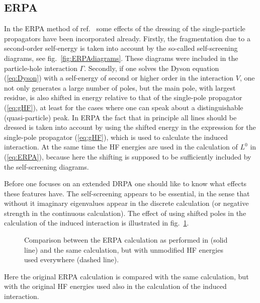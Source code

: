 \subsection{ERPA\label{sect:resultsEPRA}}
%
In the ERPA method of ref.~\cite{BAD90} some effects of the 
dressing of the single-particle 
propagators have been incorporated already. Firstly, the fragmentation due to
a second-order self-energy is taken into account  by the so-called 
self-screening diagrams, see fig.~\ref{fig:ERPAdiagrams}. 
These diagrams were included in the particle-hole interaction $\Gamma$. 
Secondly, if one solves the Dyson equation 
(\ref{eq:Dyson}) with a self-energy of second or higher order in the 
interaction $V$, one 
not only generates a large number of poles, but the main pole, with largest 
residue, is also shifted in energy relative to that of the single-pole 
propagator (\ref{eq:gHF}),
at least for the cases where one can 
speak about a distinguishable (quasi-particle) peak. In ERPA\cite{BAD90} 
the fact that
in principle all lines should be dressed is taken into account by 
using the shifted
energy in the expression for the single-pole propagator (\ref{eq:gHF}), 
which is
used to calculate the induced interaction. At the same time the HF energies are
used in the calculation of $L^0$ in (\ref{eq:ERPA}), because here the shifting
is supposed to be sufficiently included by the self-screening diagrams.

Before one focuses on an extended DRPA one should like to know what effects 
these features have. The self-screening appears to be essential, in the sense
that without it imaginary eigenvalues appear in the discrete calculation 
(or negative strength in the continuous calculation). The effect of using 
shifted poles in 
the calculation of the induced interaction is illustrated
in fig.~\ref{fig:plotENEN}. 
\begin{figure}
\centerline{
}
\caption[]{
Comparison between the ERPA calculation as performed in \cite{BAD90} 
(solid line)
and the
same calculation, but with unmodified HF energies used everywhere (dashed line).
\label{fig:plotENEN}}
\end{figure}
Here the original ERPA calculation is compared with the same calculation, but 
with the original HF energies used also in the calculation of the induced 
interaction. 
%
